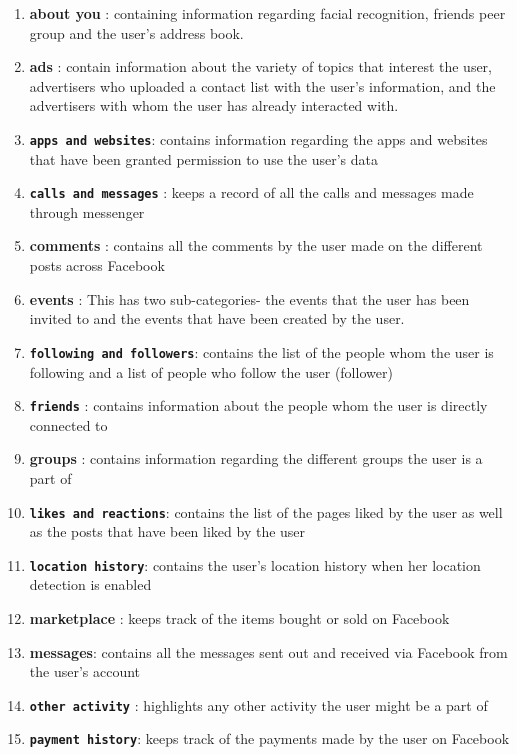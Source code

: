 \begin{enumerate}[i]
   \item \textbf{about you }: containing information regarding facial recognition, friends peer group and the user's address book.
   \item \textbf{ads} : contain information about the variety of topics that interest the user, advertisers who uploaded a contact list with the user's information, and the advertisers with whom the user has already interacted with.
   \item \textbf{\texttt{apps and websites}}: contains information regarding the apps and websites that have been granted permission to use the user's data
   \item \textbf{\texttt{calls and messages}} : keeps a record of all the calls and messages made through messenger
   \item \textbf{comments} : contains all the comments by the user made on the different posts across Facebook
   \item \textbf{events} : This has two sub-categories- the events that the user has been invited to and the events that have been created by the user.
   \item \textbf{\texttt{following and followers}}: contains the list of the people whom the user is following and a list of people who follow the user (follower)
   \item \textbf{\texttt{friends}} : contains information about the people whom the user is directly connected to
   \item \textbf{groups} : contains information regarding the different groups the user is a part of
   \item \textbf{\texttt{likes and reactions}}: contains the list of the pages liked by the user as well as the posts that have been liked by the user
   \item \textbf{\texttt{location history}}: contains the user's location history when her location detection is enabled
   \item \textbf{marketplace} : keeps track of the items bought or sold on Facebook
   \item \textbf{messages}: contains all the messages sent out and received via Facebook from the user's account
   \item \textbf{\texttt{other activity}} : highlights any other activity the user might be a part of
   \item \textbf{\texttt{payment history}}: keeps track of the payments made by the user on Facebook

\end{enumerate}

